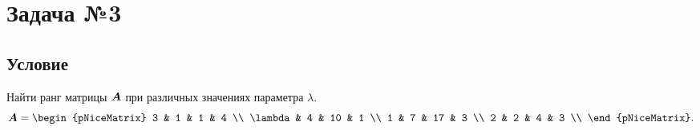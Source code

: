 \documentclass[12pt, a4paper]{article}
\renewcommand{\vec}[1]{\text{\mathversion{bold}${#1}$}}%
\begin{document}
		\newpage
		
		\section{Задача №3}
		
			\subsection*{Условие}
			Найти ранг матрицы $\vec A$ при различных значениях параметра $\lambda$.
			\begin{equation*}
				\vec A = 
				\begin{pNiceMatrix}
					3 & 1 & 1 & 4 \\
					\lambda & 4 & 10 & 1 \\
					1 & 7 & 17 & 3 \\
					2 & 2 & 4 & 3 \\
				\end{pNiceMatrix}.
			\end{equation*}
\end{document}
